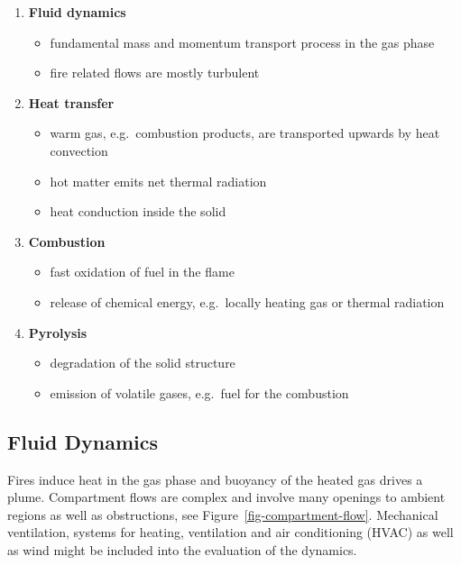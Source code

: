 \documentclass[
  letterpaper,
  DIV=11,
  numbers=noendperiod]{scrreprt}
\providecommand{\tightlist}{%
  \setlength{\itemsep}{0pt}\setlength{\parskip}{0pt}}\usepackage{longtable,booktabs,array}
\begin{document}
\begin{enumerate}
\def\labelenumi{\arabic{enumi}.}
\tightlist
\item
  \textbf{Fluid dynamics}

  \begin{itemize}
  \tightlist
  \item
    fundamental mass and momentum transport process in the gas phase
  \item
    fire related flows are mostly turbulent
  \end{itemize}
\item
  \textbf{Heat transfer}

  \begin{itemize}
  \tightlist
  \item
    warm gas, e.g.~combustion products, are transported upwards by heat
    convection
  \item
    hot matter emits net thermal radiation
  \item
    heat conduction inside the solid
  \end{itemize}
\item
  \textbf{Combustion}

  \begin{itemize}
  \tightlist
  \item
    fast oxidation of fuel in the flame
  \item
    release of chemical energy, e.g.~locally heating gas or thermal
    radiation
  \end{itemize}
\item
  \textbf{Pyrolysis}

  \begin{itemize}
  \tightlist
  \item
    degradation of the solid structure
  \item
    emission of volatile gases, e.g.~fuel for the combustion
  \end{itemize}
\end{enumerate}

\subsection{Fluid Dynamics}\label{fluid-dynamics}

Fires induce heat in the gas phase and buoyancy of the heated gas drives
a plume. Compartment flows are complex and involve many openings to
ambient regions as well as obstructions, see
Figure~\ref{fig-compartment-flow}. Mechanical ventilation, systems for
heating, ventilation and air conditioning (HVAC) as well as wind might
be included into the evaluation of the dynamics.
\end{document}
